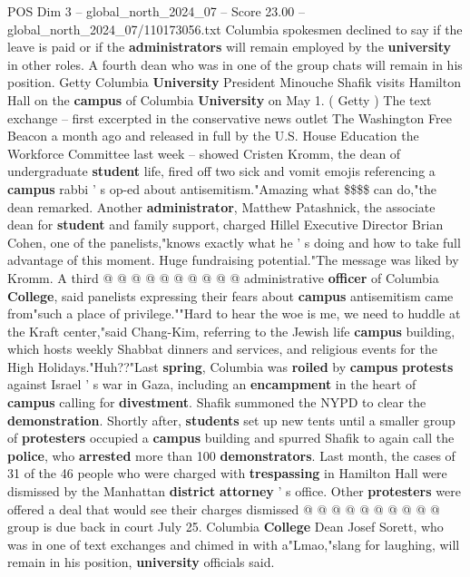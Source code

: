\begin{textsample}{POS Dim 3 – global\_north\_2024\_07 – Score 23.00 – global\_north\_2024\_07/110173056.txt}  \label{ex:f3_pos_081}
Columbia spokesmen declined to say if the leave is paid or if the \textbf{administrators} will remain employed by the \textbf{university} in other roles.
A fourth dean who was in one of the group chats will remain in his position.
Getty Columbia \textbf{University} President Minouche Shafik visits Hamilton Hall on the \textbf{campus} of Columbia \textbf{University} on May 1. ( Getty ) The text exchange -- first excerpted in the conservative news outlet The Washington Free Beacon a month ago and released in full by the U.S.
House Education the Workforce Committee last week -- showed Cristen Kromm, the dean of undergraduate \textbf{student} life, fired off two sick and vomit emojis referencing a \textbf{campus} rabbi ' s op-ed about antisemitism."Amazing what \$\$\$\$ can do,"the dean remarked.
Another \textbf{administrator}, Matthew Patashnick, the associate dean for \textbf{student} and family support, charged Hillel Executive Director Brian Cohen, one of the panelists,"knows exactly what he ' s doing and how to take full advantage of this moment.
Huge fundraising potential."The message was liked by Kromm.
A third @ @ @ @ @ @ @ @ @ @ administrative \textbf{officer} of Columbia \textbf{College}, said panelists expressing their fears about \textbf{campus} antisemitism came from"such a place of privilege.""Hard to hear the woe is me, we need to huddle at the Kraft center,"said Chang-Kim, referring to the Jewish life \textbf{campus} building, which hosts weekly Shabbat dinners and services, and religious events for the High Holidays."Huh??"Last \textbf{spring}, Columbia was \textbf{roiled} by \textbf{campus} \textbf{protests} against Israel ' s war in Gaza, including an \textbf{encampment} in the heart of \textbf{campus} calling for \textbf{divestment}.
Shafik summoned the NYPD to clear the \textbf{demonstration}.
Shortly after, \textbf{students} set up new tents until a smaller group of \textbf{protesters} occupied a \textbf{campus} building and spurred Shafik to again call the \textbf{police}, who \textbf{arrested} more than 100 \textbf{demonstrators}.
Last month, the cases of 31 of the 46 people who were charged with \textbf{trespassing} in Hamilton Hall were dismissed by the Manhattan \textbf{district} \textbf{attorney} ' s office.
Other \textbf{protesters} were offered a deal that would see their charges dismissed @ @ @ @ @ @ @ @ @ @ group is due back in court July 25.
Columbia \textbf{College} Dean Josef Sorett, who was in one of text exchanges and chimed in with a"Lmao,"slang for laughing, will remain in his position, \textbf{university} officials said.

\end{textsample}
